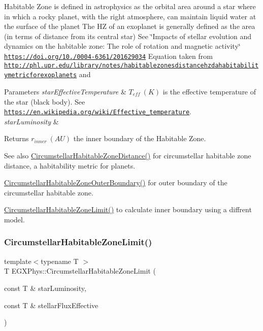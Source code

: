 Habitable Zone is defined in astrophysics as the orbital area around a star where in which a rocky planet, with the right atmosphere, can maintain liquid water at the surface of the planet The HZ of an exoplanet is generally defined as the area (in terms of distance from its central star) See \char`\"{}\+Impacts of stellar evolution and dynamics on the habitable zone\+: The role of rotation and magnetic activity\char`\"{} \href{https://doi.org/10.1051/0004-6361/201629034}{\tt https\+://doi.\+org/10./0004-\/6361/201629034} Equation taken from \href{http://phl.upr.edu/library/notes/habitablezonesdistancehzdahabitabilitymetricforexoplanets}{\tt http\+://phl.\+upr.\+edu/library/notes/habitablezonesdistancehzdahabitabilitymetricforexoplanets} and 
\begin{DoxyParams}{Parameters}
{\em star\+Effective\+Temperature} & $T_{eff}\ (K)$ is the effective temperature of the star (black body). See \href{https://en.wikipedia.org/wiki/Effective_temperature}{\tt https\+://en.\+wikipedia.\+org/wiki/\+Effective\+\_\+temperature}. \\
\hline
{\em star\+Luminosity} & \\
\hline
\end{DoxyParams}
\begin{DoxyReturn}{Returns}
$r_{inner}\ (AU)$ the inner boundary of the Habitable Zone. 
\end{DoxyReturn}
\begin{DoxySeeAlso}{See also}
\mbox{\hyperlink{group___astrophysics_gacf3a720793cdb27f6d93b170b44e81be}{Circumstellar\+Habitable\+Zone\+Distance()}} for circumstellar habitable zone distance, a habitability metric for planets. 

\mbox{\hyperlink{group___astrophysics_gaa47fcde814ba8007de800e930fc0a08d}{Circumstellar\+Habitable\+Zone\+Outer\+Boundary()}} for outer boundary of the circumstellar habitable zone. 

\mbox{\hyperlink{group___astrophysics_ga23a8f602461ea3257e8767b1d455c383}{Circumstellar\+Habitable\+Zone\+Limit()}} to calculate inner boundary using a diffrent model. 
\end{DoxySeeAlso}
\mbox{\label{group___astrophysics_ga23a8f602461ea3257e8767b1d455c383}} 
\subsubsection{\texorpdfstring{Circumstellar\+Habitable\+Zone\+Limit()}{CircumstellarHabitableZoneLimit()}}
{\footnotesize\ttfamily template$<$typename T $>$ \\
T E\+G\+X\+Phys\+::\+Circumstellar\+Habitable\+Zone\+Limit (\begin{DoxyParamCaption}\item[{const T \&}]{star\+Luminosity,  }\item[{const T \&}]{stellar\+Flux\+Effective }\end{DoxyParamCaption})}



